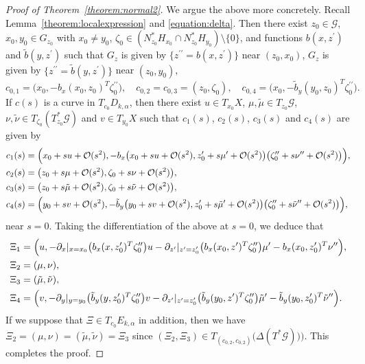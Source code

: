 \documentclass[a4paper,11pt,reqno]{amsart}
\theoremstyle{definition}
\theoremstyle{remark}
\begin{document}
\begin{proof}[Proof of Theorem~\ref{theorem:normal2}]
%
We argue the above more concretely. 
Recall Lemma~\ref{theorem:localexpression} and \eqref{equation:delta}. 
Then there exist $z_0 \in \mathcal{G}$, $x_0,y_0 \in G_{z_0}$ with $x_0{\ne}y_0$, 
$\zeta_0 \in (N^\ast_{z_0}H_{x_0}{\cap}N^\ast_{z_0}H_{y_0})\setminus\{0\}$, 
and functions $b(x,z^\prime)$ and $\tilde{b}(y,z^\prime)$ such that 
$G_z$ is given by $\{z^{\prime\prime}=b(x,z^\prime)\}$ near $(z_0,x_0)$, 
$G_z$ is given by $\{z^{\prime\prime}=\tilde{b}(y,z^\prime)\}$ near $(z_0,y_0)$, 
%
%
$$
c_{0,1}=\bigl(x_0,-b_x(x_0,z_0)^T\zeta_0^{\prime\prime}\bigr), 
\quad
c_{0,2}=c_{0,3}=(z_0,\zeta_0), 
\quad
c_{0,4}=\bigl(x_0,-\tilde{b}_y(y_0,z_0)^T\zeta_0^{\prime\prime}\bigr). 
$$
%
%
If $c(s)$ is a curve in $T_{c_0}D_{k,\alpha}$, then there exist 
$u \in T_{x_0}X$, $\mu,\tilde{\mu} \in T_{z_0}\mathcal{G}$, $\nu,\tilde{\nu} \in T_{\zeta_0}(T^\ast_{z_0}\mathcal{G}) $ and $v \in T_{y_0}X$ such that 
$c_1(s)$, $c_2(s)$, $c_3(s)$ and $c_4(s)$ are given by 
%
%
\begin{align*}
    c_1(s)
& =
    \Bigl(x_0+su+\mathcal{O}(s^2), -b_x\bigl(x_0+su+\mathcal{O}(s^2),z_0^\prime+s\mu^\prime+\mathcal{O}(s^2)\bigr)\bigl(\zeta_0^{\prime\prime}+s\nu^{\prime\prime}+\mathcal{O}(s^2)\bigr)\Bigr),
\\
    c_2(s)
& =
    \bigl(z_0+s\mu+\mathcal{O}(s^2),\zeta_0+s\nu+\mathcal{O}(s^2)\bigr), 
\\
    c_3(s)
& =
   \bigl(z_0+s\tilde{\mu}+\mathcal{O}(s^2),\zeta_0+s\tilde{\nu}+\mathcal{O}(s^2)\bigr),
\\
   c_4(s)
& =
    \Bigl(y_0+sv+\mathcal{O}(s^2), -\tilde{b}_y\bigl(y_0+sv+\mathcal{O}(s^2),z_0^\prime+s\tilde{\mu}^\prime+\mathcal{O}(s^2)\bigr)\bigl(\zeta_0^{\prime\prime}+s\tilde{\nu}^{\prime\prime}+\mathcal{O}(s^2)\bigr)\Bigr),
\end{align*}
%
%
near $s=0$. Taking the differentiation of the above at $s=0$, we deduce that 
%
%
\begin{align*}
    \Xi_1
& = 
    \Bigl(
    u, 
    -
    \partial_x\vert_{x=x_0}
   \bigl(b_x(x,z_0^\prime)^T\zeta_0^{\prime\prime}\bigr)u
    -
    \partial_{z^\prime}\vert_{z^\prime=z_0^\prime}\bigl(b_x(x_0,z^\prime)^T\zeta_0^{\prime\prime}\bigr)\mu^\prime
    -
    b_x(x_0,z_0^\prime)^T\nu^{\prime\prime}   
    \Bigr),
\\
    \Xi_2
& = 
   (\mu,\nu),
\\
    \Xi_3
& =
   (\tilde{\mu},\tilde{\nu}),
\\
    \Xi_4
& = 
    \Bigl(
    v, 
    -
    \partial_y\vert_{y=y_0}
   \bigl(\tilde{b}_y(y,z_0^\prime)^T\zeta_0^{\prime\prime}\bigr)v
    -
    \partial_{z^\prime}\vert_{z^\prime=z_0^\prime}\bigl(\tilde{b}_y(y_0,z^\prime)^T\zeta_0^{\prime\prime}\bigr)\tilde{\mu}^\prime
    -
    \tilde{b}_y(y_0,z_0^\prime)^T\tilde{\nu}^{\prime\prime}   
    \Bigr). 
\end{align*}
%
%
If we suppose that $\Xi \in T_{c_0}E_{k,\alpha}$ in addition, then we have $\Xi_2= (\mu,\nu)=(\tilde{\mu},\tilde{\nu})=\Xi_3$ 
since $(\Xi_2,\Xi_3)  \in T_{(c_{0,2},c_{0,2})}\bigl(\Delta(T^\ast\mathcal{G}))\bigr)$. 
This completes the proof. 
\end{proof}
\end{document}
